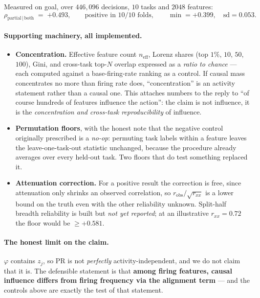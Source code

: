 \documentclass[11pt]{article}
\begin{document}
Measured on goal, over $446{,}096$ decisions, $10$ tasks and $2048$ features:
\begin{equation*}
\rho_{\text{partial}\,\mid\,\text{both}} \;=\; \mathbf{+0.493},
\qquad \text{positive in } 10/10 \text{ folds},
\qquad \min = +0.399, \quad \mathrm{sd} = 0.053 .
\end{equation*}

\paragraph{Supporting machinery, all implemented.}
\begin{itemize}
\item \textbf{Concentration.} Effective feature count $n_{\mathrm{eff}}$, Lorenz shares
      (top $1\%$, $10$, $50$, $100$), Gini, and cross-task top-$N$ overlap expressed as a
      \emph{ratio to chance} --- each computed against a base-firing-rate ranking as a control.
      If causal mass concentrates no more than firing rate does, ``concentration'' is an
      activity statement rather than a causal one. This attaches numbers to the reply to
      ``of course hundreds of features influence the action'': the claim is not influence, it is
      the \emph{concentration and cross-task reproducibility} of influence.
\item \textbf{Permutation floors}, with the honest note that the negative control originally
      prescribed is a \emph{no-op}: permuting task labels within a feature leaves the
      leave-one-task-out statistic unchanged, because the procedure already averages over every
      held-out task. Two floors that do test something replaced it.
\item \textbf{Attenuation correction.} For a positive result the correction is free, since
      attenuation only shrinks an observed correlation, so $r_{\mathrm{obs}}/\sqrt{r_{xx}}$ is a
      lower bound on the truth even with the other reliability unknown. Split-half breadth
      reliability is built but \emph{not yet reported}; at an illustrative $r_{xx}=0.72$ the
      floor would be $\ge +0.581$.
\end{itemize}

\paragraph{The honest limit on the claim.} $\varphi$ contains $z_j$, so $\mathrm{PR}$ is not
\emph{perfectly} activity-independent, and we do not claim that it is. The defensible statement
is that \textbf{among firing features, causal influence differs from firing frequency via the
alignment term} --- and the controls above are exactly the test of that statement.
\end{document}
